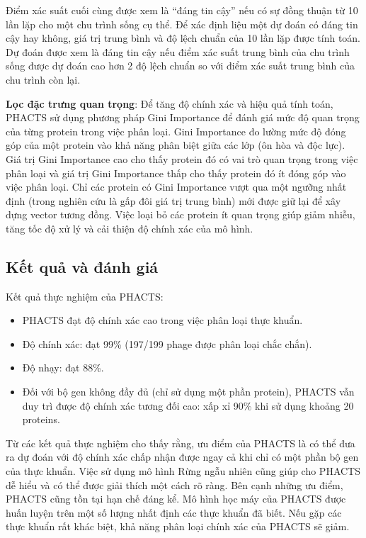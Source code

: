 Điểm xác suất cuối cùng được xem là “đáng tin cậy” nếu có sự đồng thuận từ 10 lần lặp cho một chu trình sống cụ thể. Để xác định liệu một dự đoán có đáng tin cậy hay không, giá trị trung bình và độ lệch chuẩn của 10 lần lặp được tính toán. Dự đoán được xem là đáng tin cậy nếu điểm xác suất trung bình của chu trình sống được dự đoán cao hơn 2 độ lệch chuẩn so với điểm xác suất trung bình của chu trình còn lại.

\textbf{Lọc đặc trưng quan trọng}: Để tăng độ chính xác và hiệu quả tính toán, PHACTS sử dụng phương pháp Gini Importance để đánh giá mức độ quan trọng của từng protein trong việc phân loại. Gini Importance đo lường mức độ đóng góp của một protein vào khả năng phân biệt giữa các lớp (ôn hòa và độc lực). Giá trị Gini Importance cao cho thấy protein đó có vai trò quan trọng trong việc phân loại và giá trị Gini Importance thấp cho thấy protein đó ít đóng góp vào việc phân loại. Chỉ các protein có Gini Importance vượt qua một ngưỡng nhất định (trong nghiên cứu là gấp đôi giá trị trung bình) mới được giữ lại để xây dựng vector tương đồng. Việc loại bỏ các protein ít quan trọng giúp giảm nhiễu, tăng tốc độ xử lý và cải thiện độ chính xác của mô hình.

\subsection*{Kết quả và đánh giá}
Kết quả thực nghiệm của PHACTS:
    \begin{itemize}
        \item PHACTS đạt độ chính xác cao trong việc phân loại thực khuẩn.
        \item Độ chính xác: đạt 99\% (197/199 phage được phân loại chắc chắn). 
        \item Độ nhạy: đạt 88\%. 
        \item Đối với bộ gen không đầy đủ (chỉ sử dụng một phần protein), PHACTS vẫn duy trì được độ chính xác tương đối cao: xấp xỉ 90\% khi sử dụng khoảng 20 proteins.
    \end{itemize}

Từ các kết quả thực nghiệm cho thấy rằng, ưu điểm của PHACTS là có thể đưa ra dự đoán với độ chính xác chấp nhận được ngay cả khi chỉ có một phần bộ gen của thực khuẩn. Việc sử dụng mô hình Rừng ngẫu nhiên cũng giúp cho PHACTS dễ hiểu và có thể được giải thích một cách rõ ràng. Bên cạnh những ưu điểm, PHACTS cũng tồn tại hạn chế đáng kể. Mô hình học máy của PHACTS được huấn luyện trên một số lượng nhất định các thực khuẩn đã biết. Nếu gặp các thực khuẩn rất khác biệt, khả năng phân loại chính xác của PHACTS sẽ giảm.

